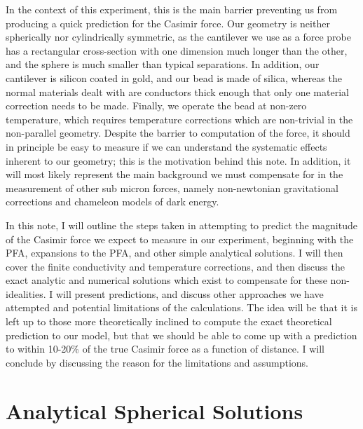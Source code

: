 \documentclass[11pt]{article}
\begin{document}
In the context of this experiment, this is the main barrier preventing us from producing a quick prediction for the Casimir force. Our geometry is neither spherically nor cylindrically symmetric, as the cantilever we use as a force probe has a rectangular cross-section with one dimension much longer than the other, and the sphere is much smaller than typical separations. In addition, our cantilever is silicon coated in gold, and our bead is made of silica, whereas the normal materials dealt with are conductors thick enough that only one material correction needs to be made. Finally, we operate the bead at non-zero temperature, which requires temperature corrections which are non-trivial in the non-parallel geometry. Despite the barrier to computation of the force, it should in principle be easy to measure if we can understand the systematic effects inherent to our geometry; this is the motivation behind this note. In addition, it will most likely represent the main background we must compensate for in the measurement of other sub micron forces, namely non-newtonian gravitational corrections and chameleon models of dark energy.

In this note, I will outline the steps taken in attempting to predict the magnitude of the Casimir force we expect to measure in our experiment, beginning with the PFA, expansions to the PFA, and other simple analytical solutions. I will then cover the finite conductivity and temperature corrections, and then discuss the exact analytic and numerical solutions which exist to compensate for these non-idealities. I will present predictions, and discuss other approaches we have attempted and potential limitations of the calculations. The idea will be that it is left up to those more theoretically inclined to compute the exact theoretical prediction to our model, but that we should be able to come up with a prediction to within 10-20\% of the true Casimir force as a function of distance. I will conclude by discussing the reason for the limitations and assumptions.

\section{Analytical Spherical Solutions}
\end{document}
